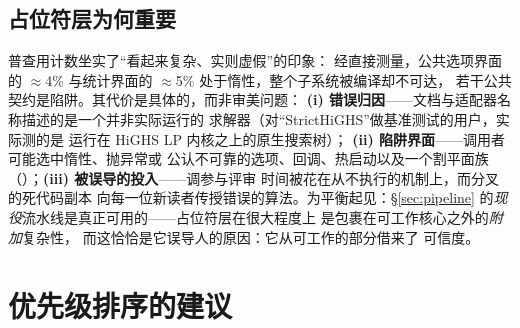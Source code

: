 \documentclass[11pt]{ctexart}
\begin{document}
\subsection{占位符层为何重要}
普查用计数坐实了“看起来复杂、实则虚假”的印象：
经直接测量，公共选项界面的 $\approx$4\% 与统计界面的
$\approx$5\% 处于惰性，整个子系统被编译却不可达，
若干公共契约是陷阱。其代价是具体的，而非审美问题：
\textbf{(i) 错误归因}——文档与适配器名称描述的是一个并非实际运行的
求解器（对“StrictHiGHS”做基准测试的用户，实际测的是
运行在 HiGHS LP 内核之上的原生搜索树）；
\textbf{(ii) 陷阱界面}——调用者可能选中惰性、抛异常或
公认不可靠的选项、回调、热启动以及一个割平面族
（）；\textbf{(iii) 被误导的投入}——调参与评审
时间被花在从不执行的机制上，而分叉的死代码副本
向每一位新读者传授错误的算法。为平衡起见：\S\ref{sec:pipeline}
的\emph{现役}流水线是真正可用的——占位符层在很大程度上
是包裹在可工作核心之外的\emph{附加}复杂性，
而这恰恰是它误导人的原因：它从可工作的部分借来了
可信度。

\section{优先级排序的建议}
\label{sec:recommendations}
\end{document}
